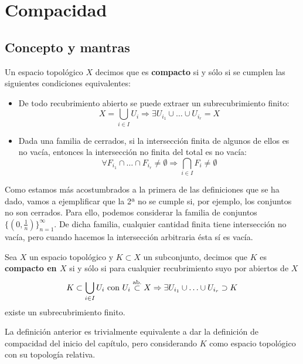 \chapter{Compacidad}%
\label{cha:compacidad}
\section{Concepto y mantras}%
\label{sec:concepto_y_mantras_comp}
\begin{defi}[Compacidad]
Un espacio topológico $X$ decimos que es \textbf{compacto} si y sólo si se cumplen las siguientes condiciones equivalentes:
\begin{itemize}
\item De todo recubrimiento abierto se puede extraer un subrecubrimiento finito:
\[
X = \bigcup_{i \in  I} U_i \Rightarrow \exists U_{i_1} \cup \ldots \cup U_{i_r} = X
\]
\item Dada una familia de cerrados, si la intersección finita de algunos de ellos es no vacía, entonces la intersección no finita del total es no vacía:
\[
\forall F_{i_1} \cap \ldots \cap F_{i_r} \neq \emptyset \Rightarrow \bigcap_{i \in  I} F_i \neq \emptyset
\]
\end{itemize}
\end{defi}

\begin{ej}
Como estamos más acostumbrados a la primera de las definiciones que se ha dado, vamos a ejemplificar que la 2ª no se cumple si, por ejemplo, los conjuntos no son cerrados. Para ello, podemos considerar la familia de conjuntos $\{\left( 0, \frac{1}{n} \right)\}_{n = 1}^\infty$. De dicha familia, cualquier cantidad finita tiene intersección no vacía, pero cuando hacemos la intersección arbitraria ésta sí es vacía.
\end{ej}

\begin{defi}
Sea $X$ un espacio topológico y $K \subset X$ un subconjunto, decimos que $K$ es \textbf{compacto en $X$} si y sólo si para cualquier recubrimiento suyo por abiertos de $X$
\[
K \subset \bigcup_{i \in  I} U_i \text{ con } U_i \stackrel{\text{ab.}}{\subset} X \Rightarrow \exists U_{i_1} \cup \ldots \cup U_{i_r} \supset K
\]
existe un subrecubrimiento finito.
\end{defi}

\begin{obs}
La definición anterior es trivialmente equivalente a dar la definición de compacidad del inicio del capítulo, pero considerando $K$ como espacio topológico con su topología relativa.
\end{obs}

